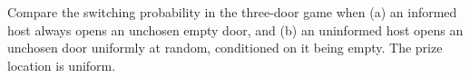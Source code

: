 Compare the switching probability in the three-door game when (a) an informed host always opens an unchosen empty door, and (b) an uninformed host opens an unchosen door uniformly at random, conditioned on it being empty. The prize location is uniform.
